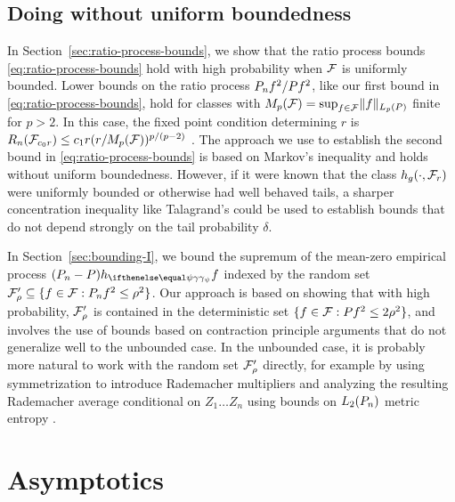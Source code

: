 \subsection{Doing without uniform boundedness}
\label{sec:not-uniformly-bounded}
In Section~\ref{sec:ratio-process-bounds},
we show that the ratio process bounds \eqref{eq:ratio-process-bounds}
hold with high probability when $\mathcal{F}$ is uniformly bounded.
Lower bounds on the ratio process $\Pn f^2 / \P f^2$, like 
our first bound in \eqref{eq:ratio-process-bounds},
hold for classes with $M_p(\F) = \sup_{f \in \F} \norm{f}_{L_p(\P)}$ finite
for $p > 2$. In this case, the fixed point condition determining $r$ is $R_n(\mathcal{F}_{c_0r}) \le c_1 r (r /M_{p}(\mathcal{F}))^{p/(p-2)}$ 
\citep[Corollary 3.6]{mendelson2017extending}. 
The approach we use to establish the second bound in \eqref{eq:ratio-process-bounds}
is based on Markov's inequality and holds without uniform boundedness.
However, if it were known that the class $h_{g}(\cdot,\mathcal{F}_r)$ were uniformly bounded or otherwise had well behaved tails,
a sharper concentration inequality like Talagrand's \citep[e.g.,][Theorem 3.3.9]{gine2015mathematical}
could be used to establish bounds that do not depend strongly on the tail probability $\delta$.

In Section~\ref{sec:bounding-I}, we bound the supremum of the mean-zero empirical process
$(\Pn - \P)h_{\riesz[\psi]}f$ indexed by the random set $\F'_{\rho} \subseteq \set{f \in \F : \Pn f^2 \le \rho^2}$. 
Our approach is based on showing that with high probability, $\mathcal{F}'_{\rho}$ is contained in the 
deterministic set $\set {f \in \F : \P f^2 \le 2\rho^2}$,
and involves the use of bounds based on contraction principle arguments 
that do not generalize well to the unbounded case. In the unbounded case,
it is probably more natural to work with the random set $\mathcal{F}'_{\rho}$ directly, 
for example by using symmetrization to introduce Rademacher multipliers 
and analyzing the resulting Rademacher average conditional on $Z_1 \ldots Z_n$ using
bounds on $L_2(\Pn)$ metric entropy \citep[see e.g.,][Theorem 3.5.1]{gine2015mathematical}.



\section{Asymptotics}
\label{sec:asymptotics}

